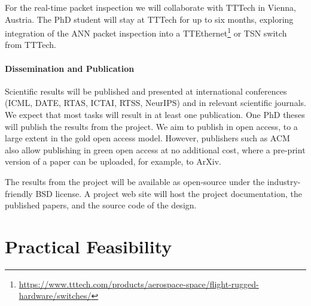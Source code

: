 \documentclass[fleqn,12pt]{article}
\newcommand{\note}[1]{{\it Note: #1}}
\begin{document}
For the real-time packet inspection we will collaborate with TTTech in Vienna, Austria.
The PhD student will stay at TTTech for up to six months, exploring integration of the
ANN packet inspection into a TTEthernet\footnote{\url{https://www.tttech.com/products/aerospace-space/flight-rugged-hardware/switches/}}
or TSN switch from TTTech.


%

\paragraph*{Dissemination and Publication}

Scientific results will be published and presented at international
conferences (ICML, DATE, RTAS, ICTAI, RTSS, NeurIPS) and in relevant scientific journals.
We expect that most tasks will result in at least one publication.
One PhD theses will publish the results from the project.
We aim to publish in open access, to a large extent in the gold open access model.
However, publishers such as ACM also allow publishing in green open access
at no additional cost, where a pre-print version of a paper can be uploaded,
for example, to ArXiv.

The results from the project will be available as open-source under the
industry-friendly BSD license.
A project web site will host the project documentation, the published papers, and the
source code of the design.



\section{Practical Feasibility}
\end{document}
